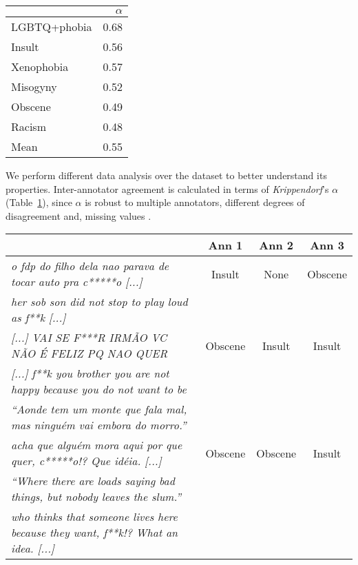 \documentclass[11pt,a4paper]{article}
\begin{document}
\begin{table}[!ht]
    \centering
    \begin{tabular}{@{}lr@{}}
    \toprule
                 & $\alpha$ \\ \midrule
    LGBTQ+phobia & 0.68  \\
    Insult       & 0.56  \\
    Xenophobia   & 0.57  \\
    Misogyny     & 0.52  \\
    Obscene      & 0.49  \\
    Racism       & 0.48  \\ \midrule
    Mean         & 0.55  \\ \bottomrule
    \end{tabular}
     \label{tab:kappa}
\end{table}


We perform different data analysis over the dataset to better understand its properties. Inter-annotator agreement is calculated in terms of \textit{Krippendorf}’s $\alpha$ (Table~\ref{tab:kappa}), since $\alpha$ is robust to multiple annotators, different degrees of disagreement and, missing values \cite{artstein-poesio-2008-survey}. 


\begin{table*}[!ht]
\centering
\setlength{\tabcolsep}{2pt}
\begin{tabular}{@{}p{11.3cm}ccc@{}}
\toprule
           & Ann 1 & Ann 2 & Ann 3 \\ \midrule
\textit{o fdp do filho dela nao parava de tocar auto pra c*****o [...]} & Insult      & None        & Obscene     \\
\footnotesize{\textit{her sob son did not stop to play loud as f**k [...]}} & & & \\
\hline
\textit{[...] VAI SE F***R IRMÃO VC NÃO É FELIZ PQ NAO QUER}  & Obscene     & Insult      & Insult      \\
\footnotesize{\textit{[...] f**k you brother you are not happy because you do not want to be}} & & & \\
\hline
\textit{``Aonde tem um monte que fala mal, mas ninguém vai embora do morro.''}\\ \textit{acha que alguém mora aqui por que quer, c*****o!? Que idéia. [...]} & Obscene     & Obscene     & Insult      \\ 

\footnotesize{\textit{``Where there are loads saying bad things, but nobody leaves the slum.''}} \\ \footnotesize{\textit{who thinks that someone lives here because they want, f**k!? What an idea. [...] }} & & & \\

\bottomrule
\end{tabular}
\label{tab:divergence}
\end{table*}
\end{document}
